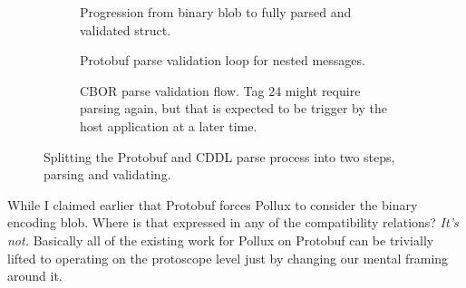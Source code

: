 \documentclass[11pt]{article}
\theoremstyle{definition}
\theoremstyle{plain}
\begin{document}
\begin{figure}[H]
  \centering
  \begin{subfigure}[b]{\textwidth}
    \centering
    \caption{Progression from binary blob to fully parsed and validated struct.}
  \end{subfigure}

  \begin{subfigure}[b]{0.4\textwidth}
    \centering
    \caption{Protobuf parse validation loop for nested messages.}
  \end{subfigure}
  \hspace{1cm}
  \begin{subfigure}[b]{0.4\textwidth}
    \centering
    \caption{CBOR parse validation flow. Tag 24 might require parsing again, but
    that is expected to be trigger by the host application at a later time.}
  \end{subfigure}

  \caption{Splitting the Protobuf and CDDL parse process into two steps, parsing
    and validating.}
  \label{fig:parse-validate}
\end{figure}

While I claimed earlier that Protobuf forces Pollux to consider the binary
encoding blob. Where is that expressed in any of the compatibility relations?
\emph{It's not.} Basically all of the existing work for Pollux on Protobuf can
be trivially lifted to operating on the protoscope level just by changing our
mental framing around it.
\end{document}
